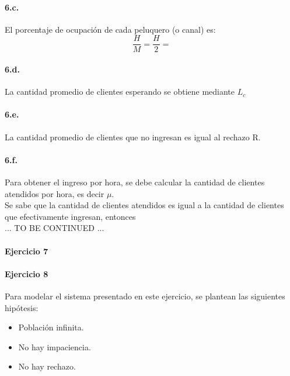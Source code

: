 \documentclass{article}
\begin{document}
    \paragraph{6.c.} El porcentaje de ocupación de cada peluquero (o canal) es: \\
    $$\frac{H}{M} = \frac{H}{2} = $$
    
    \paragraph{6.d.} La cantidad promedio de clientes esperando se obtiene mediante $L_c$
    
    \paragraph{6.e.} La cantidad promedio de clientes que no ingresan es igual al rechazo R.
    
    \paragraph{6.f.} Para obtener el ingreso por hora, se debe calcular la cantidad de clientes atendidos por hora, es decir $\mu$.\\
    Se sabe que la cantidad de clientes atendidos es igual a la cantidad de clientes que efectivamente ingresan, entonces \\
  
    ... TO BE CONTINUED ...

\paragraph{Ejercicio 7}

\paragraph{Ejercicio 8}
   Para modelar el sistema presentado en este ejercicio, se plantean las siguientes hipótesis:

   \begin{itemize}
      \item Población infinita.
      \item No hay impaciencia.
      \item No hay rechazo.
   \end{itemize}
\end{document}

